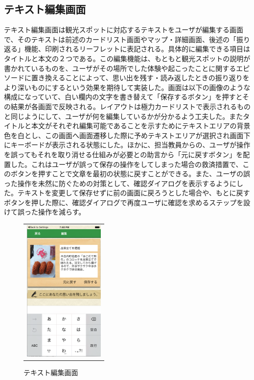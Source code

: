 \subsection{テキスト編集画面}
テキスト編集画面は観光スポットに対応するテキストをユーザが編集する画面で、そのテキストは前述のカードリスト画面やマップ・詳細画面、後述の「振り返る」機能、印刷されるリーフレットに表記される。具体的に編集できる項目はタイトルと本文の２つである。この編集機能は、もともと観光スポットの説明が書かれているものを、ユーザがその場所でした体験や起こったことに関するエピソードに置き換えることによって、思い出を残す・読み返したときの振り返りをより深いものにするという効果を期待して実装した。画面は以下の画像のような構成になっていて、白い欄内の文字を書き替えて「保存するボタン」を押すとその結果が各画面で反映される。レイアウトは極力カードリストで表示されるものと同じようにして、ユーザが何を編集しているかが分かるよう工夫した。またタイトルと本文がそれぞれ編集可能であることを示すためにテキストエリアの背景色を白とし、この画面へ画面遷移した際に予めテキストエリアが選択され画面下にキーボードが表示される状態にした。ほかに、担当教員からの、ユーザが操作を誤ってもそれを取り消せる仕組みが必要との助言から「元に戻すボタン」を配置した。これはユーザが誤って保存の操作をしてしまった場合の救済措置で、このボタンを押すことで文章を最初の状態に戻すことができる。また、ユーザの誤った操作を未然に防ぐための対策として、確認ダイアログを表示するようにした。テキストを変更して保存せずに前の画面に戻ろうとした場合や、もとに戻すボタンを押した際に、確認ダイアログで再度ユーザに確認を求めるステップを設けて誤った操作を減らす。


\begin{figure}[htbp]
  \begin{center}
    \begin{tabular}{c}

      \begin{minipage}{0.33\hsize}
        \begin{center}
\includegraphics[width=4cm, bb=0 0 303 573]{kiko_edit.png}
        \end{center}
      \end{minipage}

    \end{tabular}
    \caption{テキスト編集画面}
    \label{fig:lena}
  \end{center}
\end{figure}

